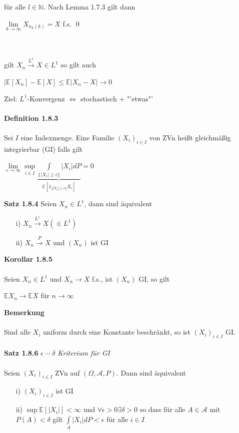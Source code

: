 \documentclass[10pt,a4paper]{report}
\newcommand{\E}{\mathbb{E}}
\newcommand{\N}{\mathbb{N}}
\numberwithin{equation}{section}
\numberwithin{figure}{section}
\theoremstyle{plain}
\theoremstyle{definition}
\theoremstyle{plain}
\theoremstyle{definition}
\theoremstyle{remark}
\theoremstyle{plain}
\begin{document}
für alle $l \in \N$. Nach Lemma 1.7.3 gilt dann 
\begin{center}
$\lim\limits_{k \to \infty} X_{n_k(k)}=X$ f.s. \qed
\end{center}
$ $\\\\
gilt $X_n\overset{L^1}{\to} X \in L^1$ so gilt auch
\begin{center}
$|\E[X_n]-\E[X] \leq \E|X_n-X| \to 0$
\end{center}
Ziel: $L^1$-Konvergenz $\Leftrightarrow$ stochastisch + "'etwas"'\\\\
\textbf{Definition 1.8.3}\\\\
Sei $I$ eine Indexmenge. Eine Familie $(X_i)_{i \in I}$ von ZVn heißt gleichmäßig integrierbar (GI) falls gilt
\begin{center}
$\lim\limits_{c \to \infty} \sup\limits_{i \in I} \underbrace{\int\limits_{\{|X_i|\geq c\}}|X_i|dP}_{\E[1_{\{|X_i|\geq c\}}X_i]}=0 $
\end{center}
\textbf{Satz 1.8.4} Seien $X_n \in L^1$, dann sind äquivalent
\begin{itemize}
\item[i)] $X_n \overset{L^1}{\to} X (\in L^1)$
\item[ii)] $X_n \overset{P}{\to} X$ und $(X_n)$ ist GI
\end{itemize}
\textbf{Korollar 1.8.5}\\\\
Seien $X_n \in L^1$ und $X_n \to X$ f.s., ist $(X_n)$ GI, so gilt
\begin{center}
$\E X_n \to \E X$ für $n \to \infty$
\end{center} 
\textbf{Bemerkung}\\\\
Sind alle $X_i$ uniform durch eine Konstante beschränkt, so ist $(X_i)_{i \in I}$ GI.\\\\
\textbf{Satz 1.8.6} \textit{$\epsilon - \delta$ Kriterium für GI}\\\\
Seien $(X_i)_{i \in I}$ ZVn auf $(\Omega, \mathcal{A},P)$. Dann sind äquivalent
\begin{itemize}
\item[i)] $(X_i)_{i \in I}$ ist GI
\item[ii)] $\sup \E [|X_i|]< \infty$ und $\forall \epsilon > 0 \exists \delta >0$ so dass für alle $A \in \mathcal{A}$ mit $P(A)< \delta$ gilt $\int\limits_A |X_i|dP<\epsilon$ für alle $i \in I$
\end{itemize}
\end{document}
